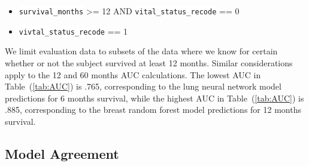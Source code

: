 \documentclass[a4paper,11pt]{article}
\newcommand{\codewhite}[1]{\colorbox{white}{\texttt{#1}}}
\begin{document}
\begin{itemize}[noitemsep]
\item \codewhite{survival\_months} >= 12 AND \codewhite{vital\_status\_recode} == 0
\item \codewhite{vivtal\_status\_recode} == 1
\end{itemize}

We limit evaluation data to subsets of the data where we know for certain whether or not the subject survived at least 12 months. Similar considerations apply to the 12 and 60 months AUC calculations. The lowest AUC in Table~(\ref{tab:AUC}) is .765, corresponding to the lung neural network model predictions for 6 months survival, while the highest AUC in Table~(\ref{tab:AUC}) is .885, corresponding to the breast random forest model predictions for 12 months survival.








\subsection{Model Agreement}
\end{document}
